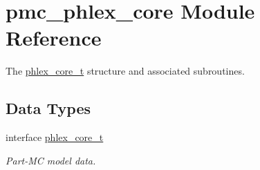 \hypertarget{namespacepmc__phlex__core}{}\section{pmc\+\_\+phlex\+\_\+core Module Reference}
\label{namespacepmc__phlex__core}


The \mbox{\hyperlink{structpmc__phlex__core_1_1phlex__core__t}{phlex\+\_\+core\+\_\+t}} structure and associated subroutines.  


\subsection*{Data Types}
\begin{DoxyCompactItemize}
\item 
interface \mbox{\hyperlink{structpmc__phlex__core_1_1phlex__core__t}{phlex\+\_\+core\+\_\+t}}
\begin{DoxyCompactList}\small\item\em Part-\/\+MC model data. \end{DoxyCompactList}\end{DoxyCompactItemize}
